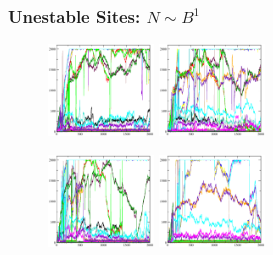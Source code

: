 \documentclass[xcolor=x11names,compress]{beamer}
\renewcommand{\(}{\begin{columns}}
\renewcommand{\)}{\end{columns}}
\newcommand{\<}[1]{\begin{column}{#1}}
\renewcommand{\>}{\end{column}}
\begin{document}
\begin{frame}
\frametitle{Unestable Sites: $N \sim B^{1}$}
\begin{figure}
\includegraphics[width=0.25\textwidth]{./TS_s17_st13_Alpha_1_012.eps}
\includegraphics[width=0.25\textwidth]{./TS_s17_st24_Alpha_1_13.eps}
\end{figure}
\begin{figure}
\includegraphics[width=0.25\textwidth]{./TS_s17_st22_Alpha_0_96.eps}
\includegraphics[width=0.25\textwidth]{./TS_s17_st30_Alpha_0_58.eps}
\end{figure}
\end{frame}
\end{document}
